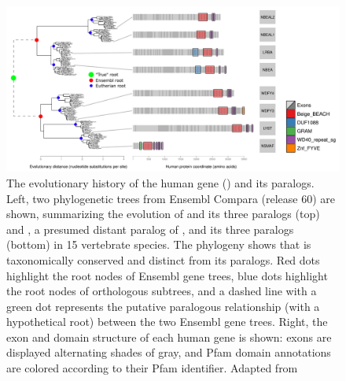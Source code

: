 \begin{figure}
\centering
\includegraphics[scale=0.35]{Figs/nbeal2_full.pdf}
\caption{The evolutionary history of the human  gene () and its paralogs. Left, two phylogenetic
  trees from Ensembl Compara (release 60) are shown, summarizing the
  evolution of  and its three paralogs (top) and
  , a presumed distant paralog of , and its
  three paralogs (bottom) in 15 vertebrate species. The phylogeny
  shows that  is taxonomically conserved and distinct
  from its paralogs. Red dots highlight the root nodes of Ensembl gene
  trees, blue dots highlight the root nodes of \euth orthologous
  subtrees, and a dashed line with a green dot represents the putative
  paralogous relationship (with a hypothetical root) between the two
  Ensembl gene trees. Right, the exon and domain structure of each
  human gene is shown: exons are displayed alternating shades of gray,
  and Pfam domain annotations are colored according to their Pfam
  identifier. Adapted from \citep{Albers2011}}
\label{nbeal2}
\end{figure}

